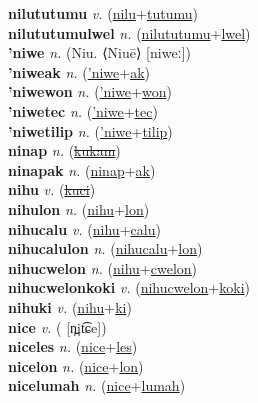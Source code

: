 \textbf{nilututumu} \textit{v.} (\hyperref[nilu]{nilu}+\hyperref[tutumu]{tutumu})
 \label{nilututumu} \\
\textbf{nilututumulwel} \textit{n.} (\hyperref[nilututumu]{nilututumu}+\hyperref[lwel]{lwel})
 \label{nilututumulwel} \\
\textbf{'niwe} \textit{n.} (Niu. ⟨Niuē⟩ [niweː])
 \label{'niwe} \\
\textbf{'niweak} \textit{n.} (\hyperref['niwe]{'niwe}+\hyperref[ak]{ak})
 \label{'niweak} \\
\textbf{'niwewon} \textit{n.} (\hyperref['niwe]{'niwe}+\hyperref[won]{won})
 \label{'niwewon} \\
\textbf{'niwetec} \textit{n.} (\hyperref['niwe]{'niwe}+\hyperref[tec]{tec})
 \label{'niwetec} \\
\textbf{'niwetilip} \textit{n.} (\hyperref['niwe]{'niwe}+\hyperref[tilip]{tilip})
 \label{'niwetilip} \\
\textbf{ninap} \textit{n.} (\hyperref[kukam]{\sout{kukam}})
 \label{ninap} \\
\textbf{ninapak} \textit{n.} (\hyperref[ninap]{ninap}+\hyperref[ak]{ak})
 \label{ninapak} \\
\textbf{nihu} \textit{v.} (\hyperref[kuci]{\sout{kuci}})
 \label{nihu} \\
\textbf{nihulon} \textit{n.} (\hyperref[nihu]{nihu}+\hyperref[lon]{lon})
 \label{nihulon} \\
\textbf{nihucalu} \textit{v.} (\hyperref[nihu]{nihu}+\hyperref[calu]{calu})
 \label{nihucalu} \\
\textbf{nihucalulon} \textit{n.} (\hyperref[nihucalu]{nihucalu}+\hyperref[lon]{lon})
 \label{nihucalulon} \\
\textbf{nihucwelon} \textit{n.} (\hyperref[nihu]{nihu}+\hyperref[cwelon]{cwelon})
 \label{nihucwelon} \\
\textbf{nihucwelonkoki} \textit{v.} (\hyperref[nihucwelon]{nihucwelon}+\hyperref[koki]{koki})
 \label{nihucwelonkoki} \\
\textbf{nihuki} \textit{v.} (\hyperref[nihu]{nihu}+\hyperref[ki]{ki})
 \label{nihuki} \\
\textbf{nice} \textit{v.} ( [n̪it͡ɕe])
 \label{nice} \\
\textbf{niceles} \textit{n.} (\hyperref[nice]{nice}+\hyperref[les]{les})
 \label{niceles} \\
\textbf{nicelon} \textit{n.} (\hyperref[nice]{nice}+\hyperref[lon]{lon})
 \label{nicelon} \\
\textbf{nicelumah} \textit{n.} (\hyperref[nice]{nice}+\hyperref[lumah]{lumah})
